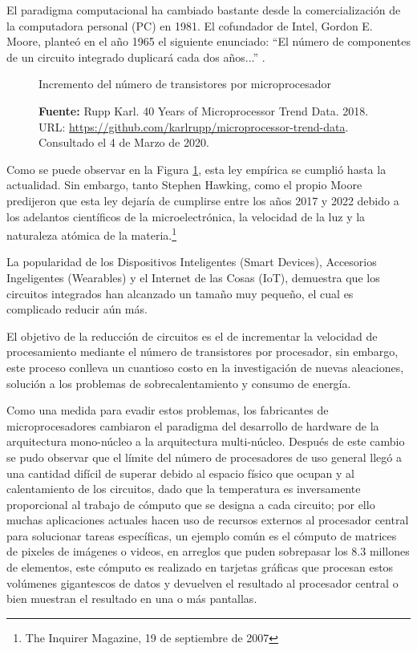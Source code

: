 \documentclass[../main/main.tex]{subfiles}
\begin{document}
\espacio

  El paradigma computacional ha cambiado bastante desde la comercialización de la computadora personal (PC) en 1981. El cofundador de Intel, Gordon E. Moore, planteó en el año 1965 el siguiente enunciado: ``El número de componentes de un circuito integrado duplicará cada dos años...'' \cite[p.~2]{article:ley_de_moore}.

  \begin{figure}[H]
    \centering
    \caption{Incremento del número de transistores por microprocesador}
    \caption*{\textbf{Fuente:} Rupp Karl. 40 Years of Microprocessor Trend Data. 2018. URL: \url{https://github.com/karlrupp/microprocessor-trend-data}. Consultado el 4 de Marzo de 2020.}
    \label{fig:transistors_microprocessor}
  \end{figure}

  Como se puede observar en la Figura \ref{fig:transistors_microprocessor}, esta ley empírica se cumplió hasta la actualidad. Sin embargo, tanto Stephen Hawking, como el propio Moore predijeron que esta ley dejaría de cumplirse entre los años 2017 y 2022 debido a los adelantos científicos de la microelectrónica, la velocidad de la luz y la naturaleza atómica de la materia.\footnote{The Inquirer Magazine, 19 de septiembre de 2007}

  La popularidad de los Dispositivos Inteligentes (Smart Devices), Accesorios Ingeligentes (Wearables) y el Internet de las Cosas (IoT), demuestra que los circuitos integrados han alcanzado un tamaño muy pequeño, el cual es complicado reducir aún más.

  El objetivo de la reducción de circuitos es el de incrementar la velocidad de procesamiento mediante el número de transistores por procesador, sin embargo, este proceso conlleva un cuantioso costo en la investigación de nuevas aleaciones, solución a los problemas de sobrecalentamiento y consumo de energía.

  Como una medida para evadir estos problemas, los fabricantes de microprocesadores cambiaron el paradigma del desarrollo de hardware de la arquitectura mono-núcleo a la arquitectura multi-núcleo. Después de este cambio se pudo observar que el límite del número de procesadores de uso general llegó a una cantidad difícil de superar debido al espacio físico que ocupan y al calentamiento de los circuitos, dado que la temperatura es inversamente proporcional al trabajo de cómputo que se designa a cada circuito; por ello muchas aplicaciones actuales hacen uso de recursos externos al procesador central para solucionar tareas específicas, un ejemplo común es el cómputo de matrices de pixeles de imágenes o videos, en arreglos que puden sobrepasar los 8.3 millones de elementos, este cómputo es realizado en tarjetas gráficas que procesan estos volúmenes gigantescos de datos y devuelven el resultado al procesador central o bien muestran el resultado en una o más pantallas.
\end{document}
